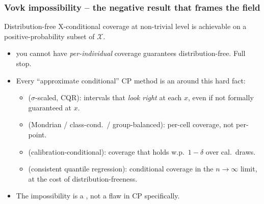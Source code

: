 \documentclass[11pt, aspectratio=169, xcolor={dvipsnames}, usepdftitle=false]{beamer}
\begin{document}
\begin{frame}
\frametitle{Vovk impossibility -- the negative result that frames the field}
\begin{lemma}
Distribution-free X-conditional coverage at non-trivial level is achievable  on a positive-probability subset of $\mathcal{X}$.
\end{lemma}
\begin{itemize}
\item {} you cannot have \emph{per-individual} coverage guarantees distribution-free. Full stop.
\item Every ``approximate conditional'' CP method is an  around this hard fact:
\begin{itemize}
\item {} ($\sigma$-scaled, CQR): intervals that \emph{look right} at each $x$, even if not formally guaranteed at $x$.
\item {} (Mondrian / class-cond.\ / group-balanced): per-cell coverage, not per-point.
\item {} (calibration-conditional): coverage that holds w.p.\ $1 - \delta$ over cal.\ draws.
\item {} (consistent quantile regression): conditional coverage in the $n \to \infty$ limit, at the cost of distribution-freeness.
\end{itemize}
\item The impossibility is a , not a flaw in CP specifically.
\end{itemize}
\end{frame}
\end{document}
